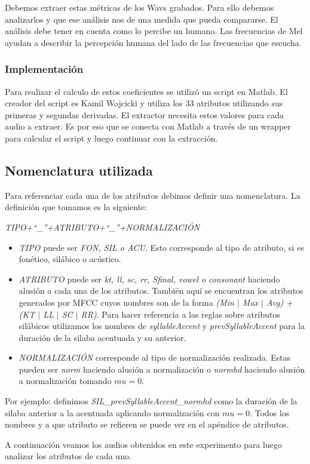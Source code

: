 Debemos extraer estas métricas de los Wavs grabados. Para ello debemos analizarlos y que ese análisis nos de una medida que pueda compararse. El análisis debe tener en cuenta como lo percibe un humano. Las frecuencias de Mel ayudan a describir la percepción humana del lado de las frecuencias que escucha. 

\subsubsection{Implementación}

Para realizar el calculo de estos coeficientes se utilizó un script en Matlab. El creador del script es Kamil Wojcicki y utiliza los 33 atributos utilizando sus primeras y segundas derivadas. El extractor necesita estos valores para cada audio a extraer. Es por eso que se conecta con Matlab a través de un wrapper para calcular el script y luego continuar con la extracción.

\subsection{Nomenclatura utilizada}
Para referenciar cada una de los atributos debimos definir una nomenclatura. La definición que tomamos es la siguiente:
\begin{center}
\textit{TIPO+``\_''+ATRIBUTO+``\_''+NORMALIZACIÓN} 
\end{center}

\begin{itemize}
  \item \emph{TIPO} puede ser \emph{FON, SIL o ACU}. Esto corresponde al tipo de atributo, si es fonético, silábico o acústico.
  \item \emph{ATRIBUTO} puede ser \emph{kt, ll, sc, rr, Sfinal, vowel o consonant} haciendo alusión a cada una de los atributos. También aquí se encuentran los atributos generados por MFCC cuyos nombres son de la forma \emph{(Min $|$ Max $|$ Avg) + (KT $|$ LL $|$ SC $|$ RR)}. Para hacer referencia a las reglas sobre atributos silábicos utilizamos los nombres de \emph{syllableAccent} y \emph{prevSyllableAccent} para la duración de la silaba acentuada y su anterior.
  \item \emph{NORMALIZACIÓN} corresponde al tipo de normalización realizada. Estas pueden ser \emph{norm} haciendo alusión a normalización o \emph{normhd} haciendo alusión a normalización tomando $mu=0$.
\end{itemize}
 
Por ejemplo: definimos \textit{SIL\_prevSyllableAccent\_normhd} como la duración de la silaba anterior a la acentuada aplicando normalización con $mu=0$. Todos los nombres y a que atributo se refieren se puede ver en el apéndice de atributos.

A continuación veamos los audios obtenidos en este experimento para luego analizar los atributos de cada uno.